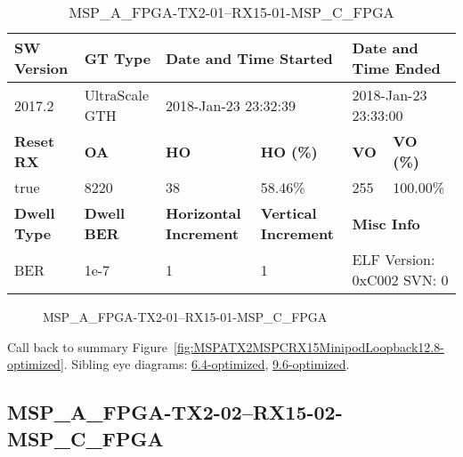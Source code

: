 \begin{table}[h]
\centering
\caption{MSP\_A\_FPGA-TX2-01--RX15-01-MSP\_C\_FPGA}
\label{tab:MSPAFPGATX201RX1501MSPCFPGA12.8-optimized}
\begin{tabular}{@{}|l|l|l|l|l|l|@{}}
\toprule
\textbf{SW Version}                & \textbf{GT Type}   & \multicolumn{2}{l|}{\textbf{Date and Time Started}}            & \multicolumn{2}{l|}{\textbf{Date and Time Ended}}        \\ \midrule
2017.2                       & UltraScale GTH          & \multicolumn{2}{l|}{2018-Jan-23 23:32:39}                   & \multicolumn{2}{l|}{2018-Jan-23 23:33:00}               \\ \midrule
\textbf{Reset RX}                  & \textbf{OA} & \textbf{HO}   & \textbf{HO (\%)} & \textbf{VO} & \textbf{VO (\%)} \\ \midrule
true & 8220        & 38          & 58.46\%        & 255        & 100.00\%       \\ \midrule
\textbf{Dwell Type}                & \textbf{Dwell BER} & \textbf{Horizontal Increment} & \textbf{Vertical Increment}    & \multicolumn{2}{l|}{\textbf{Misc Info}}                  \\ \midrule
BER                            & 1e-7        & 1        & 1           & \multicolumn{2}{l|}{ELF Version: 0xC002 SVN: 0}                         \\ \bottomrule
\end{tabular}
\end{table}

\begin{figure}[h]
\caption{MSP\_A\_FPGA-TX2-01--RX15-01-MSP\_C\_FPGA} \label{fig:MSPAFPGATX201RX1501MSPCFPGA12.8-optimized}
\end{figure}

Call back to summary Figure~\ref{fig:MSPATX2MSPCRX15MinipodLoopback12.8-optimized}.
Sibling eye diagrams: \hyperref[sec:MSPAFPGATX201RX1501MSPCFPGA6.4-optimized]{6.4-optimized}, \hyperref[sec:MSPAFPGATX201RX1501MSPCFPGA9.6-optimized]{9.6-optimized}.

\clearpage
\newpage


\subsection{MSP\_A\_FPGA-TX2-02--RX15-02-MSP\_C\_FPGA}\label{sec:MSPAFPGATX202RX1502MSPCFPGA12.8-optimized}

